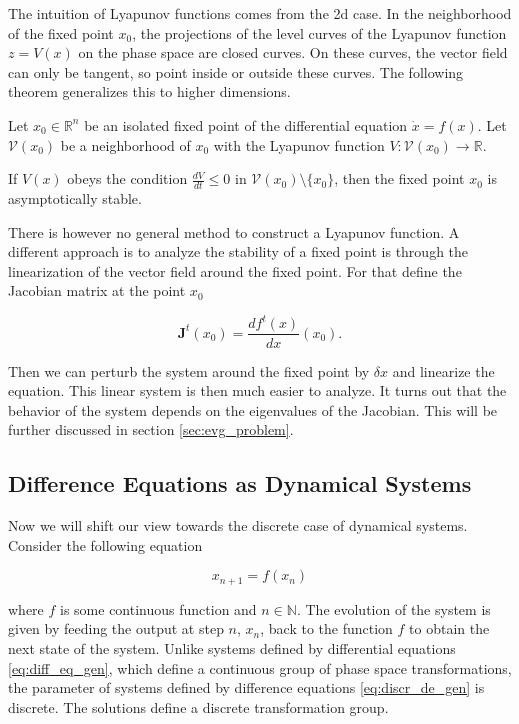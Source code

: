 The intuition of Lyapunov functions comes from the 2d case. In the neighborhood of the fixed point $x_0$, the projections of the level curves of the Lyapunov function
$z=V(x)$ on the phase space are closed curves. On these curves, the vector field can only be tangent, so point inside or outside these curves. The following
theorem generalizes this to higher dimensions.

\begin{theorem}
    Let $x_0 \in \mathbb{R}^n$ be an isolated fixed point of the differential equation $\dot{x} = f(x)$. Let $\mathcal{V}(x_0)$ be a neighborhood of $x_0$ with 
    the Lyapunov function $V:\mathcal{V}(x_0) \rightarrow\mathbb{R}$.

    If $V(x)$ obeys the condition $\frac{dV}{dt} \leq 0$ in $\mathcal{V}(x_0) \setminus \{x_0\}$, then the fixed point $x_0$ is asymptotically stable. 
\end{theorem}

There is however no general method to construct a Lyapunov function. A different approach is to analyze the stability of a fixed point is through the linearization
of the vector field around the fixed point. For that define the Jacobian matrix at the point $x_0$

\begin{equation}
    \boldsymbol{J}^t(x_0) = \frac{df^t(x)}{dx}(x_0).
\end{equation}

Then we can perturb the system around the fixed point by $\delta x$ and linearize the equation. This linear system is then much easier to analyze. It turns out that the
behavior of the system depends on the eigenvalues of the Jacobian. This will be further discussed in section \ref{sec:evg_problem}.

\subsection{Difference Equations as Dynamical Systems}

Now we will shift our view towards the discrete case of dynamical systems. Consider the following equation

\begin{equation}
    x_{n+1} = f(x_n)
    \label{eq:discr_de_gen}
\end{equation}

where $f$ is some continuous function and $n \in \mathbb{N}$. The evolution of the system is given by feeding the output at step $n$, $x_n$, back to the function $f$
to obtain the next state of the system. Unlike systems defined by differential equations \ref{eq:diff_eq_gen}, which define a continuous group of phase space transformations,
the parameter of systems defined by difference equations \ref{eq:discr_de_gen} is discrete. The solutions define a discrete transformation group.


